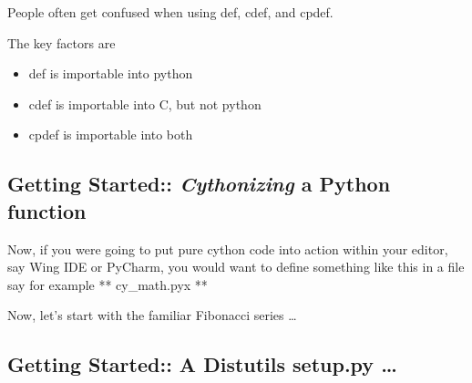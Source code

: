 \documentclass{article}
\newenvironment{Shaded}{}{}
\newcommand{\KeywordTok}[1]{\textcolor[rgb]{0.00,0.44,0.13}{\textbf{{#1}}}}
\newcommand{\DataTypeTok}[1]{\textcolor[rgb]{0.56,0.13,0.00}{{#1}}}
\newcommand{\DecValTok}[1]{\textcolor[rgb]{0.25,0.63,0.44}{{#1}}}
\newcommand{\CharTok}[1]{\textcolor[rgb]{0.25,0.44,0.63}{{#1}}}
\newcommand{\StringTok}[1]{\textcolor[rgb]{0.25,0.44,0.63}{{#1}}}
\newcommand{\CommentTok}[1]{\textcolor[rgb]{0.38,0.63,0.69}{\textit{{#1}}}}
\newcommand{\OtherTok}[1]{\textcolor[rgb]{0.00,0.44,0.13}{{#1}}}
\newcommand{\NormalTok}[1]{{#1}}
\begin{document}
People often get confused when using def, cdef, and cpdef.

The key factors are

\begin{itemize}
\itemsep1pt\parskip0pt
\item
  def is importable into python
\item
  cdef is importable into C, but not python
\item
  cpdef is importable into both
\end{itemize}

    \subsection{Getting Started:: \emph{Cythonizing} a Python
function}\label{getting-started-cythonizing-a-python-function}

Now, if you were going to put pure cython code into action within your
editor, say Wing IDE or PyCharm, you would want to define something like
this in a file say for example ** cy\_math.pyx **

Now, let's start with the familiar Fibonacci series \ldots{}

\begin{Shaded}
\end{Shaded}

    \subsection{Getting Started:: A Distutils setup.py
\ldots{}}\label{getting-started-a-distutils-setup.py}
\end{document}

